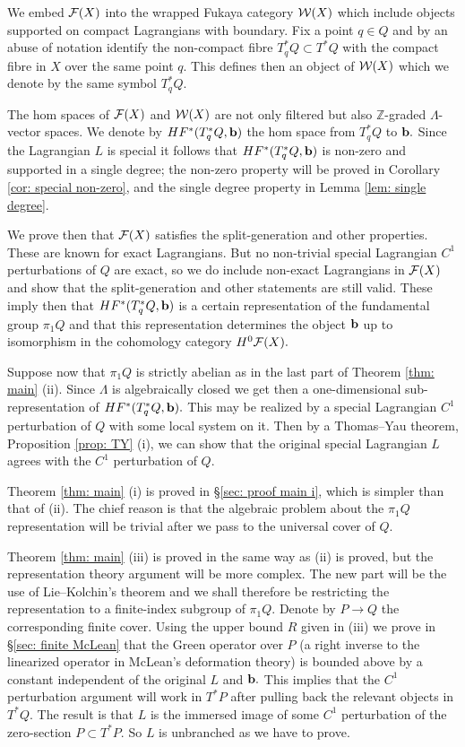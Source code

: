 \documentclass{article}
\theoremstyle{plain}%
\theoremstyle{definition}
\numberwithin{equation}{section}
\numberwithin{figure}{section}
\def\cF{{\mathbin{\cal F}}}
\def\cW{{\mathbin{\cal W}}}
\def\Z{{\mathbin{\mathbb Z}}}
\def\La{\Lambda}
\begin{document}
We embed $\cF(X)$ into the wrapped Fukaya category $\cW(X)$ which include objects supported on compact Lagrangians with boundary. Fix a point $q\in Q$ and by an abuse of notation identify the non-compact fibre $T^*_qQ\subset T^*Q$ with the compact fibre in $X$ over the same point $q.$ This defines then an object of $\cW(X)$ which we denote by the same symbol $T^*_qQ.$ 

The hom spaces of $\cF(X)$ and $\cW(X)$ are not only filtered but also $\Z$-graded $\La$-vector spaces. We denote by $HF^*(T_q^*Q,{\mathbf{b}})$ the hom space from $T^*_qQ$ to ${\mathbf{b}}.$ Since the Lagrangian $L$ is special it follows that $HF^*(T_q^*Q,{\mathbf{b}})$ is non-zero and supported in a single degree; the non-zero property will be proved in Corollary \ref{cor: special non-zero}, and the single degree property in Lemma \ref{lem: single degree}. 

We prove then that $\cF(X)$ satisfies the split-generation and other properties. These are known for exact Lagrangians. But no non-trivial special Lagrangian $C^1$ perturbations of $Q$ are exact, so we do include non-exact Lagrangians in $\cF(X)$ and show that the split-generation and other statements are still valid. These imply then that $HF^*(T_q^*Q,{\mathbf{b}})$ is a certain representation of the fundamental group $\pi_1Q$ and that this representation determines the object ${\mathbf{b}}$ up to isomorphism in the cohomology category $H^0\cF(X).$ 

Suppose now that $\pi_1Q$ is strictly abelian as in the last part of Theorem \ref{thm: main} (ii). Since $\La$ is algebraically closed we get then a one-dimensional sub-representation of $HF^*(T_q^*Q,{\mathbf{b}}).$ This may be realized by a special Lagrangian $C^1$ perturbation of $Q$ with some local system on it. Then by a Thomas--Yau theorem, Proposition \ref{prop: TY} (i), we can show that the original special Lagrangian $L$ agrees with the $C^1$ perturbation of $Q.$ 

Theorem \ref{thm: main} (i) is proved in \S\ref{sec: proof main i}, which is simpler than that of (ii). The chief reason is that the algebraic problem about the $\pi_1Q$ representation will be trivial after we pass to the universal cover of $Q.$

Theorem \ref{thm: main} (iii) is proved in the same way as (ii) is proved, but the representation theory argument will be more complex. The new part will be the use of Lie--Kolchin's theorem and we shall therefore be restricting the representation to a finite-index subgroup of $\pi_1Q.$ Denote by $P\to Q$ the corresponding finite cover. Using the upper bound $R$ given in (iii) we prove in \S\ref{sec: finite McLean} that the Green operator over $P$ (a right inverse to the linearized operator in McLean's deformation theory) is bounded above by a constant independent of the original $L$ and ${\mathbf{b}}.$ This implies that the $C^1$ perturbation argument will work in $T^*P$ after pulling back the relevant objects in $T^*Q.$ The result is that $L$ is the immersed image of some $C^1$ perturbation of the zero-section $P\subset T^*P.$ So $L$ is unbranched as we have to prove.
\end{document}
